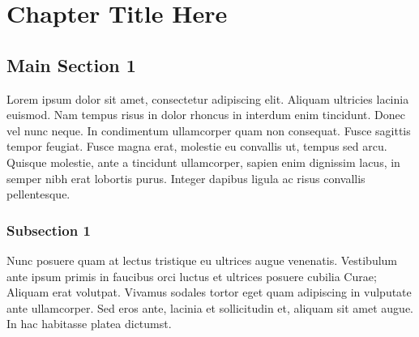 \documentclass[
12pt, %
english, %
doublespacing, %
nolistspacing, %
liststotoc, %
headsepline, %
chapterinoneline, %
openany, %
]{DoctoralThesis}\usepackage[]{graphicx}\usepackage[]{color}
\begin{document}







\chapter{Chapter Title Here} %

\label{ChapterX} %


\section{Main Section 1}

Lorem ipsum dolor sit amet, consectetur adipiscing elit. Aliquam ultricies lacinia euismod. Nam tempus risus in dolor rhoncus in interdum enim tincidunt. Donec vel nunc neque. In condimentum ullamcorper quam non consequat. Fusce sagittis tempor feugiat. Fusce magna erat, molestie eu convallis ut, tempus sed arcu. Quisque molestie, ante a tincidunt ullamcorper, sapien enim dignissim lacus, in semper nibh erat lobortis purus. Integer dapibus ligula ac risus convallis pellentesque.

\subsection{Subsection 1}

Nunc posuere quam at lectus tristique eu ultrices augue venenatis. Vestibulum ante ipsum primis in faucibus orci luctus et ultrices posuere cubilia Curae; Aliquam erat volutpat. Vivamus sodales tortor eget quam adipiscing in vulputate ante ullamcorper. Sed eros ante, lacinia et sollicitudin et, aliquam sit amet augue. In hac habitasse platea dictumst.

\end{document}
